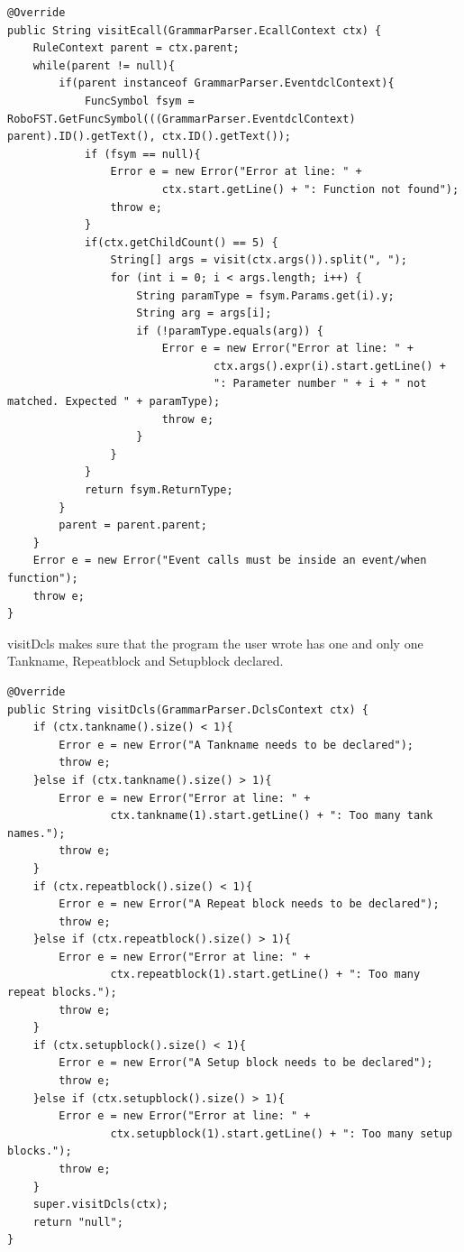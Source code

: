 \begin{lstlisting}[caption={SymbolTypeVisitor - visitEcall function}, label={VE}]
@Override
public String visitEcall(GrammarParser.EcallContext ctx) {
    RuleContext parent = ctx.parent;
    while(parent != null){
        if(parent instanceof GrammarParser.EventdclContext){
            FuncSymbol fsym = RoboFST.GetFuncSymbol(((GrammarParser.EventdclContext) parent).ID().getText(), ctx.ID().getText());
            if (fsym == null){
                Error e = new Error("Error at line: " +
                        ctx.start.getLine() + ": Function not found");
                throw e;
            }
            if(ctx.getChildCount() == 5) {
                String[] args = visit(ctx.args()).split(", ");
                for (int i = 0; i < args.length; i++) {
                    String paramType = fsym.Params.get(i).y;
                    String arg = args[i];
                    if (!paramType.equals(arg)) {
                        Error e = new Error("Error at line: " +
                                ctx.args().expr(i).start.getLine() +
                                ": Parameter number " + i + " not matched. Expected " + paramType);
                        throw e;
                    }
                }
            }
            return fsym.ReturnType;
        }
        parent = parent.parent;
    }
    Error e = new Error("Event calls must be inside an event/when function");
    throw e;
}
\end{lstlisting}

visitDcls makes sure that the program the user wrote has one and only one Tankname, Repeatblock and Setupblock declared. 

\begin{lstlisting}[caption={SymbolTypeVisitor - visitDcls function}, label={VD}]
@Override
public String visitDcls(GrammarParser.DclsContext ctx) {
    if (ctx.tankname().size() < 1){
        Error e = new Error("A Tankname needs to be declared");
        throw e;
    }else if (ctx.tankname().size() > 1){
        Error e = new Error("Error at line: " +
                ctx.tankname(1).start.getLine() + ": Too many tank names.");
        throw e;
    }
    if (ctx.repeatblock().size() < 1){
        Error e = new Error("A Repeat block needs to be declared");
        throw e;
    }else if (ctx.repeatblock().size() > 1){
        Error e = new Error("Error at line: " +
                ctx.repeatblock(1).start.getLine() + ": Too many repeat blocks.");
        throw e;
    }
    if (ctx.setupblock().size() < 1){
        Error e = new Error("A Setup block needs to be declared");
        throw e;
    }else if (ctx.setupblock().size() > 1){
        Error e = new Error("Error at line: " +
                ctx.setupblock(1).start.getLine() + ": Too many setup blocks.");
        throw e;
    }
    super.visitDcls(ctx);
    return "null";
}
\end{lstlisting}


